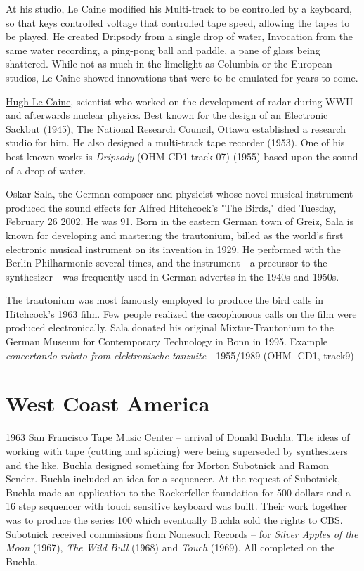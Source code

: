 At his studio, Le Caine modified his Multi-track to be controlled by a keyboard, so that keys controlled voltage that controlled tape speed, allowing the tapes to be played. He created Dripsody from a single drop of water, Invocation from the same water recording, a ping-pong ball and paddle, a pane of glass being shattered. While not as much in the limelight as Columbia or the European studios, Le Caine showed innovations that were to be emulated for years to come.

\href{http://www.hughlecaine.com}{Hugh Le Caine}, scientist who worked on the development of radar during WWII and afterwards nuclear physics. Best known for the design of an Electronic Sackbut (1945), The National Research Council, Ottawa established a research studio for him. He also designed a multi-track tape recorder (1953). One of his best known works is \textit{Dripsody} (OHM CD1 track 07) (1955) based upon the sound of a drop of water.




Oskar Sala, the German composer and physicist whose novel musical instrument produced the sound effects for Alfred Hitchcock's "The Birds," died Tuesday, February 26 2002. He was 91. Born in the eastern German town of Greiz, Sala is known for developing and mastering the trautonium, billed as the world's first electronic musical instrument on its invention in 1929. He performed with the Berlin Philharmonic several times, and the instrument - a precursor to the synthesizer - was frequently used in German advertss in the 1940s and 1950s.

The trautonium was most famously employed to produce the bird calls in Hitchcock's 1963 film. Few people realized the cacophonous calls on the film were produced electronically. Sala donated his original Mixtur-Trautonium to the German Museum for Contemporary Technology in Bonn in 1995. Example \textit{concertando rubato from elektronische tanzuite} - 1955/1989 (OHM- CD1, track9)

\section{West Coast America}
1963 San Francisco Tape Music Center – arrival of Donald Buchla. The ideas of working with tape (cutting and splicing) were being superseded by synthesizers and the like. Buchla designed something for Morton Subotnick and Ramon Sender. Buchla included an idea for a sequencer. At the request of Subotnick, Buchla made an application to the Rockerfeller foundation for 500 dollars and a 16 step sequencer with touch sensitive keyboard was built. Their work together was to produce the series 100 which eventually Buchla sold the rights to CBS. Subotnick received commissions from Nonesuch Records – for \textit{Silver Apples of the Moon} (1967), \textit{The Wild Bull} (1968) and \textit{Touch} (1969). All completed on the Buchla.

